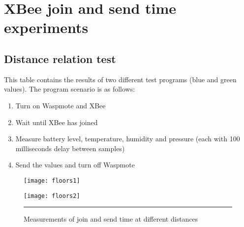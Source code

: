 \chapter{XBee join and send time experiments} %
\label{AppendixA} %
\section{Distance relation test}
This table contains the results of two different test programs (blue and green values). The program scenario is as follows:\\
\begin{enumerate}
\item Turn on Waspmote and XBee
\item Wait until XBee has joined
\item Measure battery level, temperature, humidity and pressure (each with 100 milliseconds delay between samples)
\item Send the values and turn off Waspmote
\end{enumerate} 
\hspace{1cm}
\begin{figure}[htbp]
\centering
\texttt{[image: floors1]}
\label{fig:floors1}
\end{figure}
\begin{figure}[htbp]
\centering
\texttt{[image: floors2]}
\rule{30em}{0.5pt}
\caption[XBee join and send times: distance relation]{Measurements of join and send time at different distances}
\label{fig:floors2}
\end{figure}\\

